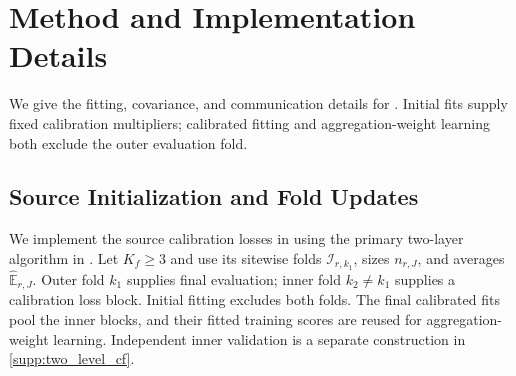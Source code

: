 \documentclass[12pt]{article}
\providecommand{\En}{\widehat{\mathbb E}}
\begin{document}
\section{Method and Implementation Details}\label{supp:primary_implementation}
We give the fitting, covariance, and communication details for . Initial fits supply fixed calibration multipliers; calibrated fitting and aggregation-weight learning both exclude the outer evaluation fold.

\subsection{Source Initialization and Fold Updates}\label{supp:primary_source_fits}
We implement the source calibration losses in  using the primary two-layer algorithm in . Let $K_f\ge3$ and use its sitewise folds $\mathcal I_{r,k_1}$, sizes $n_{r,J}$, and averages $\En_{r,J}$. Outer fold $k_1$ supplies final evaluation; inner fold $k_2\ne k_1$ supplies a calibration loss block. Initial fitting excludes both folds. The final calibrated fits pool the inner blocks, and their fitted training scores are reused for aggregation-weight learning. Independent inner validation is a separate construction in \cref{supp:two_level_cf}.
\end{document}
